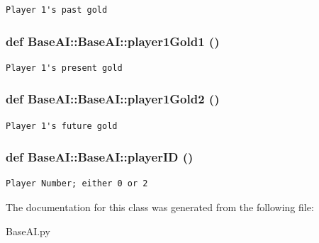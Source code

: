\footnotesize\begin{verbatim}Player 1's past gold
\end{verbatim}
\normalsize
 \hypertarget{classBaseAI_1_1BaseAI_e1ed9b73e407052b12422e1fbea89ff0}{
\subsubsection[{player1Gold1}]{\setlength{\rightskip}{0pt plus 5cm}def BaseAI::BaseAI::player1Gold1 ()}}
\label{classBaseAI_1_1BaseAI_e1ed9b73e407052b12422e1fbea89ff0}




\footnotesize\begin{verbatim}Player 1's present gold
\end{verbatim}
\normalsize
 \hypertarget{classBaseAI_1_1BaseAI_f9137f6d3da694e0b7af0328478d2200}{
\subsubsection[{player1Gold2}]{\setlength{\rightskip}{0pt plus 5cm}def BaseAI::BaseAI::player1Gold2 ()}}
\label{classBaseAI_1_1BaseAI_f9137f6d3da694e0b7af0328478d2200}




\footnotesize\begin{verbatim}Player 1's future gold
\end{verbatim}
\normalsize
 \hypertarget{classBaseAI_1_1BaseAI_60e0d6b3832faae7c85b4c9f0be10196}{
\subsubsection[{playerID}]{\setlength{\rightskip}{0pt plus 5cm}def BaseAI::BaseAI::playerID ()}}
\label{classBaseAI_1_1BaseAI_60e0d6b3832faae7c85b4c9f0be10196}




\footnotesize\begin{verbatim}Player Number; either 0 or 2
\end{verbatim}
\normalsize
 

The documentation for this class was generated from the following file:\begin{CompactItemize}
\item 
BaseAI.py\end{CompactItemize}
